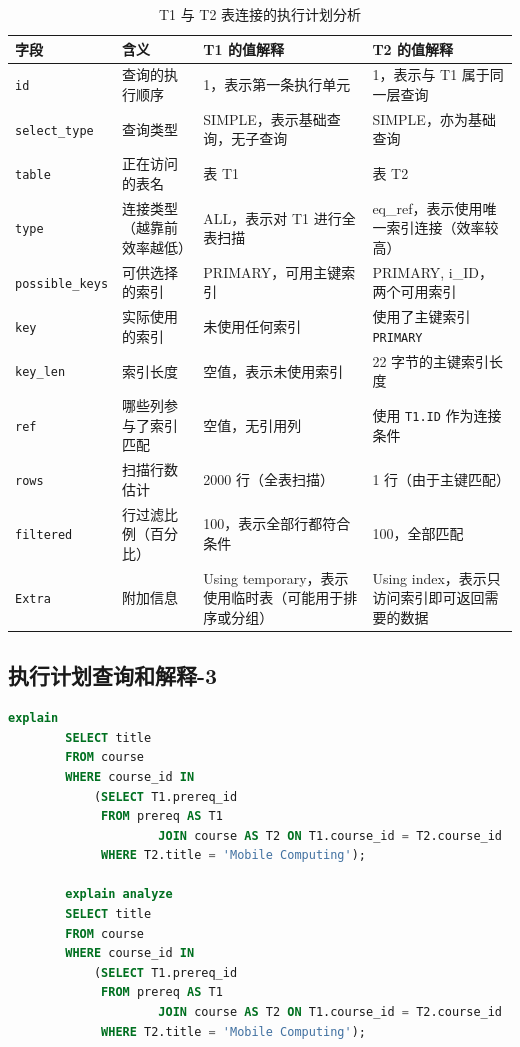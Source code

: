 \documentclass{article}
\begin{document}
	\begin{table}[H]
		\centering
		\begin{tabular}{|l|l|p{4.8cm}|p{4.8cm}|}
			\hline
			\textbf{字段} & \textbf{含义} & \textbf{T1 的值解释} & \textbf{T2 的值解释} \\
			\hline
			\texttt{id} & 查询的执行顺序 & 1，表示第一条执行单元 & 1，表示与 T1 属于同一层查询 \\
			\hline
			\texttt{select\_type} & 查询类型 & SIMPLE，表示基础查询，无子查询 & SIMPLE，亦为基础查询 \\
			\hline
			\texttt{table} & 正在访问的表名 & 表 T1 & 表 T2 \\
			\hline
			\texttt{type} & 连接类型（越靠前效率越低） & ALL，表示对 T1 进行全表扫描 & eq\_ref，表示使用唯一索引连接（效率较高） \\
			\hline
			\texttt{possible\_keys} & 可供选择的索引 & PRIMARY，可用主键索引 & PRIMARY, i\_ID，两个可用索引 \\
			\hline
			\texttt{key} & 实际使用的索引 & 未使用任何索引 & 使用了主键索引 \texttt{PRIMARY} \\
			\hline
			\texttt{key\_len} & 索引长度 & 空值，表示未使用索引 & 22 字节的主键索引长度 \\
			\hline
			\texttt{ref} & 哪些列参与了索引匹配 & 空值，无引用列 & 使用 \texttt{T1.ID} 作为连接条件 \\
			\hline
			\texttt{rows} & 扫描行数估计 & 2000 行（全表扫描） & 1 行（由于主键匹配） \\
			\hline
			\texttt{filtered} & 行过滤比例（百分比） & 100，表示全部行都符合条件 & 100，全部匹配 \\
			\hline
			\texttt{Extra} & 附加信息 & Using temporary，表示使用临时表（可能用于排序或分组） & Using index，表示只访问索引即可返回需要的数据 \\
			\hline
		\end{tabular}
		\caption{T1 与 T2 表连接的执行计划分析}
	\end{table}
	
	\subsection{执行计划查询和解释-3}
	
	\begin{lstlisting}[language=sql, title=执行以下语句，获取并解释该查询执行计划, tabsize=4]
		explain
		SELECT title
		FROM course
		WHERE course_id IN
			(SELECT T1.prereq_id
			 FROM prereq AS T1
					 JOIN course AS T2 ON T1.course_id = T2.course_id
			 WHERE T2.title = 'Mobile Computing');
		
		explain analyze
		SELECT title
		FROM course
		WHERE course_id IN
			(SELECT T1.prereq_id
			 FROM prereq AS T1
					 JOIN course AS T2 ON T1.course_id = T2.course_id
			 WHERE T2.title = 'Mobile Computing');
	\end{lstlisting}
	
\end{document}
